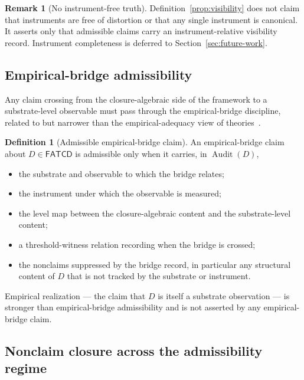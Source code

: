 \documentclass[11pt]{article}
\theoremstyle{definition}
\newtheorem{definition}[theorem]{Definition}
\newtheorem{remark}[theorem]{Remark}
\newcommand{\FATCD}{\ensuremath{\mathsf{FATCD}}}
\newcommand{\Audit}[1]{\ensuremath{\operatorname{Audit}\!\left(#1\right)}}
\begin{document}
\begin{remark}[No instrument-free truth]\label{rem:no-instrument-free}
Definition~\ref{prop:visibility} does not claim that instruments are
free of distortion or that any single instrument is canonical. It
asserts only that admissible claims carry an instrument-relative
visibility record. Instrument completeness is deferred to
Section~\ref{sec:future-work}.
\end{remark}

\subsection{Empirical-bridge admissibility}\label{subsec:empirical-bridge}

Any claim crossing from the closure-algebraic side of the framework
to a substrate-level observable must pass through the
empirical-bridge discipline, related to but narrower than
the empirical-adequacy view of theories~\citep{vanFraassen1980}.

\begin{definition}[Admissible empirical-bridge claim]\label{prop:empirical-bridge}
An empirical-bridge claim about \(D \in \FATCD{}\) is admissible only when
it carries, in \(\Audit{D}\),
\begin{itemize}[topsep=2pt,itemsep=1pt]
  \item the substrate and observable to which the bridge relates;
  \item the instrument under which the observable is measured;
  \item the level map between the closure-algebraic content and the
    substrate-level content;
  \item a threshold-witness relation recording when the bridge is
    crossed;
  \item the nonclaims suppressed by the bridge record, in particular any
    structural content of \(D\) that is not tracked by the substrate or
    instrument.
\end{itemize}
Empirical realization --- the claim that \(D\) is itself a substrate
observation --- is stronger than empirical-bridge admissibility and is
not asserted by any empirical-bridge claim.
\end{definition}


\subsection{Nonclaim closure across the admissibility regime}\label{subsec:nonclaim-closure}
\end{document}
